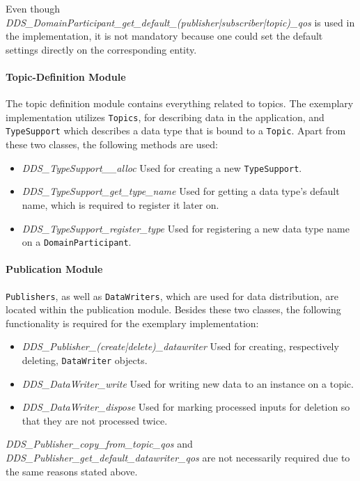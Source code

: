 Even though \textit{DDS\_DomainParticipant\_get\_default\_(publisher|subscriber|topic)\_qos} is used in the implementation, it is not mandatory because one could set the default  settings directly on the corresponding entity.

\paragraph{Topic-Definition Module}
The topic definition module contains everything related to topics.
The exemplary implementation utilizes \texttt{Topics}, for describing data in the application, and \texttt{TypeSupport} which describes a data type that is bound to a \texttt{Topic}.
Apart from these two classes, the following methods are used:

\begin{itemize}
\item \textit{DDS\_TypeSupport\_\_alloc} Used for creating a new \texttt{TypeSupport}.
\item \textit{DDS\_TypeSupport\_get\_type\_name} Used for getting a data type's default name, which is required to register it later on.
\item \textit{DDS\_TypeSupport\_register\_type} Used for registering a new data type name on a \texttt{DomainParticipant}.
\end{itemize}


\paragraph{Publication Module}
\texttt{Publishers}, as well as \texttt{DataWriters}, which are used for data distribution, are located within the publication module.
Besides these two classes, the following functionality is required for the exemplary implementation:

\begin{itemize}
\item \textit{DDS\_Publisher\_(create|delete)\_datawriter} Used for creating, respectively deleting, \texttt{DataWriter} objects.
\item \textit{DDS\_DataWriter\_write} Used for writing new data to an instance on a  topic.
\item \textit{DDS\_DataWriter\_dispose} Used for marking processed inputs for deletion so that they are not processed twice.
\end{itemize}

\textit{DDS\_Publisher\_copy\_from\_topic\_qos} and \textit{DDS\_Publisher\_get\_default\_datawriter\_qos} are not necessarily required due to the same reasons stated above.

